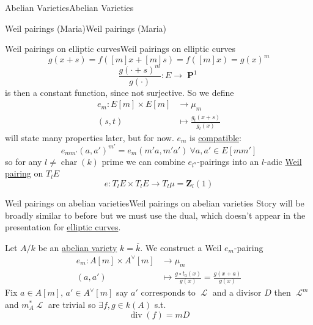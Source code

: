 \documentclass[10pt,]{book}
\numberwithin{equation}{section}
\newcommand{\sheaf}[1]{\operatorname{\mathcal{#1}}}
\newcommand{\lb}{[}
\newcommand{\rb}{]}
\newcommand{\ZZ}{\mathbf{Z}}
\DeclareMathOperator{\divisor}{div}
\DeclareMathOperator{\characteristic}{char}
\DeclareMathOperator{\PP}{\mathbf{P}}
\newcommand{\amp}{&}
\begin{document}
\begin{chapterptx}{Abelian Varieties}{}{Abelian Varieties}{}{}
\begin{sectionptx}{Weil pairings (Maria)}{}{Weil pairings (Maria)}{}{}
\begin{subsectionptx}{Weil pairings on elliptic curves}{}{Weil pairings on elliptic curves}{}{}
\begin{equation*}
g(x + s) = f([m]x + [m]s) = f([m]x) = g(x)^m
\end{equation*}
%
\begin{equation*}
\frac{g(\cdot + s)^m}{g(\cdot)} \colon E \to \PP^1
\end{equation*}
is then a constant function, since not surjective. So we define%
\begin{align*}
e_m\colon E[m]\times E[m] \amp\to \mu_m\\
(s,t)\amp \mapsto \frac{g_t(x+s)}{g_t(x)}
\end{align*}
will state many properties later, but for now. \(e_m\) is \hyperref[def-buntes-compat]{compatible}:%
\begin{equation*}
e_{mm'} (a,a')^{m'} = e_m(m'a, m'a') \ \forall a,a' \in E[mm']
\end{equation*}
so for any \(l\ne \characteristic(k)\) prime we can combine \(e_{l^n}\)-pairings into an \(l\)-adic \hyperref[prop-weil-pair]{Weil pairing} on \(T_l E\)%
\begin{equation*}
e \colon T_l E\times T_lE \to T_l \mu = \ZZ_l(1)
\end{equation*}
%
\end{subsectionptx}
%
%
\typeout{************************************************}
\typeout{************************************************}
%
\begin{subsectionptx}{Weil pairings on abelian varieties}{}{Weil pairings on abelian varieties}{}{}\label{subsection-29}
\hypertarget{p-300}{}%
Story will be broadly similar to before but we must use the dual, which doesn't appear in the presentation for \hyperref[def-supersing-isog-ec]{elliptic curves}.%
\par
\hypertarget{p-301}{}%
Let \(A/k\) be an \hyperref[def-buntes-abvar]{abelian variety} \(k = \overline k\). We construct a Weil \(e_m\)-pairing%
\begin{align*}
e_m \colon A[m]\times A^\vee [m] \amp\to \mu_m\\
(a,a') \amp\mapsto \frac{g\circ t_a(x)}{g(x)} = \frac{g(x+a)}{g(x)}
\end{align*}
Fix \(a\in A\lb m\rb,\,a'\in A^\vee\lb m\rb\) say \(a'\) corresponds to \(\sheaf L\) and a divisor \(D\) then \(\sheaf L^m \) and \(m_A^* \sheaf L\) are trivial so \(\exists f,g \in k(A)\) s.t.%
\begin{equation*}
\divisor (f) = m D
\end{equation*}
%
\begin{equation*}

\end{equation*}
\end{subsectionptx}
\end{sectionptx}
\end{chapterptx}
\end{document}

